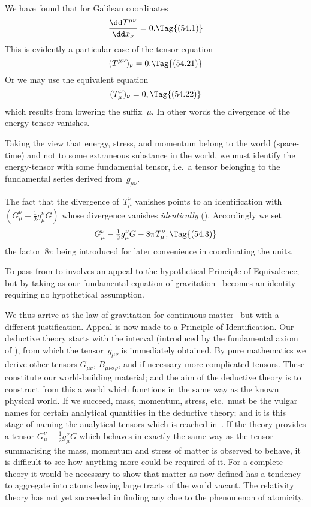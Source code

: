 \documentclass[12pt]{book}
\begin{document}
%
%

We have found that for Galilean coordinates
\[
\frac{\dd T^{\mu\nu}}{\dd x_{\nu}} = 0.
\Tag{(54.1)}
\]
This is evidently a particular case of the tensor equation
\[
(T^{\mu\nu})_{\nu} = 0.
\Tag{(54.21)}
\]
Or we may use the equivalent equation
\[
(T_{\mu}^{\nu})_{\nu} = 0,
\Tag{(54.22)}
\]
which results from lowering the suffix~$\mu$. In other words the divergence of
%
the energy-tensor vanishes.

Taking the view that energy, stress, and momentum belong to the world
(space-time) and not to some extraneous substance in the world, we must
identify the energy-tensor with some fundamental tensor, i.e.\ a tensor belonging
to the fundamental series derived from~$g_{\mu\nu}$.

The fact that the divergence of~$T_{\mu}^{\nu}$ vanishes points to an identification
with $(G_{\mu}^{\nu} - \frac{1}{2}g_{\mu}^{\nu} G)$ whose divergence vanishes \emph{identically} (). Accordingly
we set
\[
G_{\mu}^{\nu} - \tfrac{1}{2}g_{\mu}^{\nu} G - 8\pi T_{\mu}^{\nu},
\Tag{(54.3)}
\]
the factor~$8\pi$ being introduced for later convenience in coordinating the units.

To pass from  to  involves an appeal to the hypothetical
Principle of Equivalence; but by taking  as our fundamental equation
%
%
of gravitation ~becomes an identity requiring no hypothetical assumption.

We thus arrive at the law of gravitation for continuous matter~
%
but with a different justification. Appeal is now made to a Principle of
Identification. Our deductive theory starts with the interval (introduced by
the fundamental axiom of ), from which the tensor~$g_{\mu\nu}$ is immediately
obtained. By pure mathematics we derive other tensors $G_{\mu\nu}$, $B_{\mu\nu\sigma\rho}$, and if
necessary more complicated tensors. These constitute our world-building
material; and the aim of the deductive theory is to construct from this a
world which functions in the same way as the known physical world. If we
succeed, mass, momentum, stress, etc.\ must be the vulgar names for certain
analytical quantities in the deductive theory; and it is this stage of naming
the analytical tensors which is reached in~. If the theory provides a
tensor $G_{\mu}^{\nu} - \frac{1}{2} g_{\mu}^{\nu} G$ which behaves in exactly the same way as the tensor
summarising the mass, momentum and stress of matter is observed to behave,
it is difficult to see how anything more could be required of it\footnotemark.\footnotetext
  {For a complete theory it would be necessary to show that matter as now defined has a
%
  tendency to aggregate into atoms leaving large tracts of the world vacant. The relativity theory
  has not yet succeeded in finding any clue to the phenomenon of atomicity.}
\end{document}
